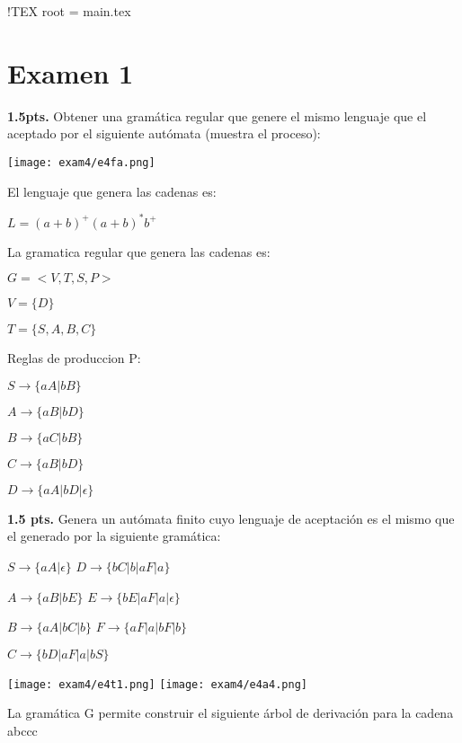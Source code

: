 !TEX root = main.tex
\renewcommand{\labelenumi}{\alph{enumi})}

\section*{Examen 1}

\begin{questions}
\question \textbf{1.5pts.} Obtener una gramática regular que genere el mismo lenguaje que el aceptado por el
siguiente autómata (muestra el proceso):

\begin{center}
    \texttt{[image: exam4/e4fa.png]}
\end{center}

    El lenguaje que genera las cadenas es:

    $L = (a + b)^{+}(a + b)^{*}b^{+}$

    La gramatica regular que genera las cadenas es: 

    $G = <V,T,S,P>$

    $V = \{D\}$

    $T = \{S, A, B, C\}$

    Reglas de produccion P:

    $S \rightarrow \{aA | bB\}$

    $A \rightarrow \{aB | bD \}$

    $B \rightarrow \{aC | bB\}$
    
    $C \rightarrow \{aB | bD\}$

    $D \rightarrow \{aA | bD | \epsilon \}$
    

\question \textbf{1.5 pts.} Genera un autómata finito cuyo lenguaje de aceptación es el mismo que el generado por
la siguiente gramática:

$S \rightarrow \{aA | \epsilon \}$  $D \rightarrow \{bC | b | aF | a \}$

$A \rightarrow \{aB | bE \}$  $E \rightarrow \{bE | aF | a | \epsilon \}$

$B \rightarrow \{aA | bC | b \}$  $F \rightarrow \{aF | a | bF | b \}$

$C \rightarrow \{bD | aF | a | bS\}$ 

        
\begin{center}    
    \texttt{[image: exam4/e4t1.png]}
    \texttt{[image: exam4/e4a4.png]}
\end{center}
 


\question La gram\'atica G permite construir el siguiente \'arbol de 
derivaci\'on para la cadena abccc



\end{questions}
